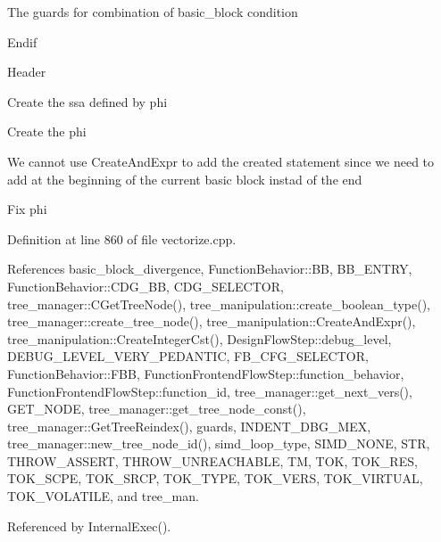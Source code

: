 The guards for combination of basic\+\_\+block condition

Endif

Header

Create the ssa defined by phi

Create the phi

We cannot use Create\+And\+Expr to add the created statement since we need to add at the beginning of the current basic block instad of the end

Fix phi 

Definition at line 860 of file vectorize.\+cpp.



References basic\+\_\+block\+\_\+divergence, Function\+Behavior\+::\+BB, B\+B\+\_\+\+E\+N\+T\+RY, Function\+Behavior\+::\+C\+D\+G\+\_\+\+BB, C\+D\+G\+\_\+\+S\+E\+L\+E\+C\+T\+OR, tree\+\_\+manager\+::\+C\+Get\+Tree\+Node(), tree\+\_\+manipulation\+::create\+\_\+boolean\+\_\+type(), tree\+\_\+manager\+::create\+\_\+tree\+\_\+node(), tree\+\_\+manipulation\+::\+Create\+And\+Expr(), tree\+\_\+manipulation\+::\+Create\+Integer\+Cst(), Design\+Flow\+Step\+::debug\+\_\+level, D\+E\+B\+U\+G\+\_\+\+L\+E\+V\+E\+L\+\_\+\+V\+E\+R\+Y\+\_\+\+P\+E\+D\+A\+N\+T\+IC, F\+B\+\_\+\+C\+F\+G\+\_\+\+S\+E\+L\+E\+C\+T\+OR, Function\+Behavior\+::\+F\+BB, Function\+Frontend\+Flow\+Step\+::function\+\_\+behavior, Function\+Frontend\+Flow\+Step\+::function\+\_\+id, tree\+\_\+manager\+::get\+\_\+next\+\_\+vers(), G\+E\+T\+\_\+\+N\+O\+DE, tree\+\_\+manager\+::get\+\_\+tree\+\_\+node\+\_\+const(), tree\+\_\+manager\+::\+Get\+Tree\+Reindex(), guards, I\+N\+D\+E\+N\+T\+\_\+\+D\+B\+G\+\_\+\+M\+EX, tree\+\_\+manager\+::new\+\_\+tree\+\_\+node\+\_\+id(), simd\+\_\+loop\+\_\+type, S\+I\+M\+D\+\_\+\+N\+O\+NE, S\+TR, T\+H\+R\+O\+W\+\_\+\+A\+S\+S\+E\+RT, T\+H\+R\+O\+W\+\_\+\+U\+N\+R\+E\+A\+C\+H\+A\+B\+LE, TM, T\+OK, T\+O\+K\+\_\+\+R\+ES, T\+O\+K\+\_\+\+S\+C\+PE, T\+O\+K\+\_\+\+S\+R\+CP, T\+O\+K\+\_\+\+T\+Y\+PE, T\+O\+K\+\_\+\+V\+E\+RS, T\+O\+K\+\_\+\+V\+I\+R\+T\+U\+AL, T\+O\+K\+\_\+\+V\+O\+L\+A\+T\+I\+LE, and tree\+\_\+man.



Referenced by Internal\+Exec().

